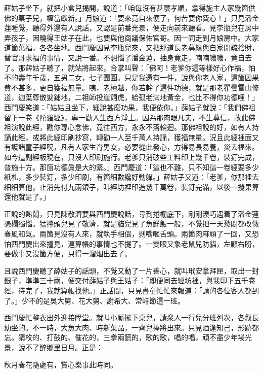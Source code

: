 薛姑子坐下，就把小盒兒揭開，說道：「咱每沒有甚麼孝順，拿得施主人家幾箇供佛的菓子兒，權當獻新。」月娘道：「要來竟自來便了，何苦要你費心！」只見潘金蓮睡覺，聽得外邊有人說話，又認是前番光景，便走向前來聽看。見李瓶兒在房中弄孩子，因曉得王姑子在此，也要與他商議保佑官哥。因一同走到月娘房中。大家道箇萬福，各各坐地。西門慶因見李瓶兒來，又把那道長老募緣與自家開疏捨財，替官哥求福的事情，又說一番。不想惱了潘金蓮，抽身竟走，喃喃噥噥，竟自去了。那薛姑子聽了，就站將起來，合掌叫聲：「佛阿！老爹你這等樣好心作福，怕不的壽年千歲，五男二女，七子團圓。只是我還有一件，說與你老人家，這箇因果費不甚多，更自獲福無量。咦，老檀越，你若幹了這件功德，就是那老瞿曇雪山修道，迦葉尊散髮鋪地，二祖師投崖飼虎，給孤老滿地黃金，也比不得你功德哩！」西門慶笑道：「姑姑且坐下，細說甚麼功果，我便依你。」薛姑子就說：「我們佛祖留下一卷《陀羅經》，專一勸人生西方淨土。因為那肉眼凡夫，不生尊信，故此佛祖演說此經，勸你專心念佛，竟往西方，永永不落輪迴。那佛祖說的好，如有人持誦此經，或將此經印刷抄寫，轉勸一人至千萬人持誦，獲福無量。況且此經裡面又有護諸童子經呪，凡有人家生育男女，必要從此發心，方得易長易養，災去福來。如今這副經板現在，只沒人印刷施行。老爹只消破些工料印上幾千卷，裝釘完成，普施十方。那箇功德眞是大的緊。」西門慶道：「這也不難，只不知這一卷經要多少紙札，多少裝釘，多少印刷，有箇細數纔好動軃。」薛姑子又道：「老爹，你那裡去細細算他，{}止消先付九兩銀子，叫經坊裡印造幾千萬卷，裝釘完滿，以後一攪果算還他就是了。」

正說的熱鬧，只見陳敬濟要與西門慶說話，尋到捲棚底下，剛剛湊巧遇着了潘金蓮憑欄獨惱。猛擡頭兒見了敬濟，就是貓兒見了魚鮮飯一般，不覺把一天愁悶都改做春風和氣。{}兩箇見沒有人來，就執手相偎，剝嘴咂舌頭。兩箇肉麻頑了一回，又恐怕西門慶出來撞見，連算帳的事情也不提了。一雙眼又象老鼠兒防貓，左顧右盼，要做事又沒箇方便，{}只得一溜烟出去了。

且說西門慶聽了薛姑子的話頭，不覺又動了一片善心，就叫玳安拿拜匣，取出一封銀子，準準三十兩，便交付薛姑子與王姑子：「即便同去經坊裡，與我印下五千卷經，待完了，我就算帳找他。」正話間，只見書童忙忙來報道：「請的各位客人都到了。」少不的是吳大舅、花大舅、謝希大、常峙節這一班。

西門慶忙整衣出外迎接陞堂。就叫小厮擺下桌兒，請衆人一行兒分班列次，各叙長幼坐的。不一時，大魚大肉、時新菓品，一齊兒捧將出來。只見酒逢知己，形跡都忘。猜枚的、打鼓的、催花的，三拳兩謊的，歌的歌，唱的唱，頑不盡少年場光景，說不了醉鄉里日月。{}正是：

\begin{myquote} 
秋月春花隨處有，賞心樂事此時同。
\end{myquote} 

